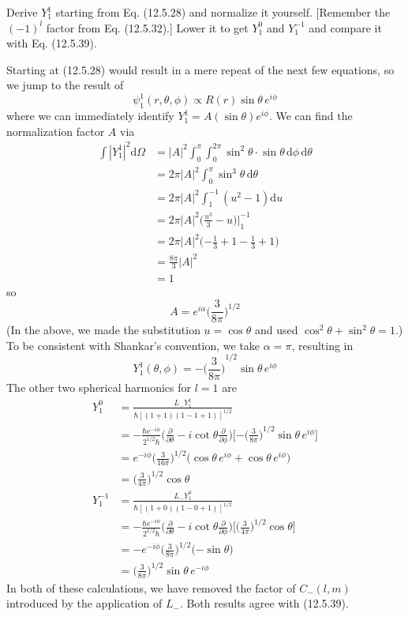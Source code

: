 \documentclass[../principles-of-quantum-mechanics.tex]{subfiles}
\begin{document}
\begin{questions}
		\question Derive $Y_1^1$ starting from Eq. (12.5.28) and normalize it yourself. [Remember the $(-1)^l$ factor from Eq. (12.5.32).] Lower it to get $Y_1^0$ and $Y_1^{-1}$ and compare it with Eq. (12.5.39).
		
		\begin{solution}
			Starting at (12.5.28) would result in a mere repeat of the next few equations, so we jump to the result of
			$$\psi_1^1(r, \theta, \phi) \propto R(r)\sin\theta \,e^{i\phi}$$
			where we can immediately identify $Y_1^1 = A(\sin\theta)e^{i\phi}$. We can find the normalization factor $A$ via
			\begin{align*}
				\int |Y_1^1|^2\mathrm{d}\Omega &= |A|^2\int_0^\pi\int_0^{2\pi}\sin^2\theta\cdot\sin\theta\,\mathrm{d}\phi\,\mathrm{d}\theta \\
				&= 2\pi|A|^2\int_0^{\pi}\sin^3\theta\,\mathrm{d}\theta \\
				&= 2\pi|A|^2\int_{1}^{-1}(u^2 - 1)\mathrm{d}u \\
				&= 2\pi|A|^2\Big(\frac{u^3}{3} - u\Big)\Big|_1^{-1} \\
				&= 2\pi|A|^2\Big({-\frac{1}{3}} + 1 - \frac{1}{3} + 1\Big) \\
				&= \frac{8\pi}{3}|A|^2 \\
				&= 1
			\end{align*}
			so
			$$A = e^{i\alpha}\Big(\frac{3}{8\pi}\Big)^{1/2}$$
			(In the above, we made the substitution $u = \cos\theta$ and used $\cos^2\theta + \sin^2\theta = 1$.) To be consistent with Shankar's convention, we take $\alpha = \pi$, resulting in
			$$Y_1^1(\theta, \phi) = {-\Big(\frac{3}{8\pi}\Big)}^{1/2}\sin\theta\,e^{i\phi}$$
			The other two spherical harmonics for $l = 1$ are
			\begin{align*}
				Y_1^0 &= \frac{L_-Y_1^1}{\hbar[(1 + 1)(1 - 1 + 1)]^{1/2}} \\
				&= {-\frac{\hbar e^{-i\phi}}{2^{1/2}\hbar }} \Big(\frac{\partial}{\partial\theta} - i\cot\theta\frac{\partial}{\partial\phi}\Big)\Big[{-\Big(\frac{3}{8\pi}\Big)}^{1/2}\sin\theta\, e^{i\phi}\Big] \\
				&=  e^{-i\phi}\Big(\frac{3}{16\pi}\Big)^{1/2}\Big(\cos\theta\,e^{i\phi} + \cos\theta\,e^{i\phi}\Big) \\
				&= \Big(\frac{3}{4\pi}\Big)^{1/2}\cos\theta \\
				Y_1^{-1} &= \frac{L_-Y_1^0}{\hbar[(1 + 0)(1 - 0 + 1)]^{1/2}} \\
				&= {-\frac{\hbar e^{-i\phi}}{2^{1/2}\hbar }} \Big(\frac{\partial}{\partial\theta} - i\cot\theta\frac{\partial}{\partial\phi}\Big)\Big[\Big(\frac{3}{4\pi}\Big)^{1/2}\cos\theta\Big] \\
				&= {-e^{-i\phi}}\Big(\frac{3}{8\pi}\Big)^{1/2}\Big({-\sin\theta}\Big) \\
				&= \Big(\frac{3}{8\pi}\Big)^{1/2}\sin\theta\,e^{-i\phi}
			\end{align*}
			In both of these calculations, we have removed the factor of $C_-(l, m)$ introduced by the application of $L_-$. Both results agree with (12.5.39).
		\end{solution}
		

\end{questions}
\end{document}
